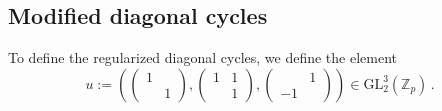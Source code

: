 \documentclass{amsart}
\numberwithin{equation}{section}
\newcommand{\Zp}{\mathbb{Z}_p}
\newcommand{\GL}{\mathrm{GL}}
\begin{document}
\subsection{Modified diagonal cycles}
\label{subsec_4_3_2024_07_31_1634}
To define the regularized diagonal cycles, we define the element
\[ u := \left(  \left( \begin{smallmatrix} 1 &  \\  & 1 \end{smallmatrix} \right), \left( \begin{smallmatrix} 1 &  1 \\  & 1 \end{smallmatrix} \right),\left( \begin{smallmatrix}  &  1 \\ -1 &  \end{smallmatrix} \right)\right) \in \GL_2^3(\Zp)\,.\]
\end{document}
